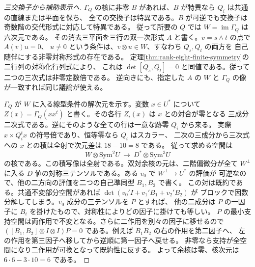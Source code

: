 \begin{proof}[三交換子から補助表示へ]
$\Gamma_Q$ の核に非零 $B$ があれば、$B$ が特異なら $Q_i$ は共通の直線または平面を保ち、
全ての交換子は特異である。$B$ が可逆でも交換子は奇数階の交代形式に対応して特異である。
従って所要の $Q$ では $W=\operatorname{im}\Gamma_Q$ は六次元である。
その消去三平面を三行の双一次形式 $A$ と書く。$v=s\wedge t$ の点で $A(v)u=0$、
$u\ne0$ という条件は、$v\otimes u\in W$、すなわち $Q_s,Q_t$ の両方を
自己随伴にする非零対称形式の存在である。
定理\ref{thm:rank-eight-finite-symmetry}の二行列の対称化行列式により、
これは $\det[Q_s,Q_t]=0$ と同値である。従って二つの三次式は非零定数倍である。
逆向きにも、指定した $A$ の $W$ と $\Gamma_Q$ の像が一致すれば同じ議論が使える。

$\Gamma_Q$ が $W$ に入る線型条件の解次元を示す。変数 $x\in U^*$ について
$Z(x)=\Gamma_Q(xx^t)$ と書く。その各行 $Z_i(x)$ は $x$ との対合が零となる
三成分二次式である。逆にそのような全ての行は一意な跡零 $Q_i$ から来る。
実際 $x\times Q_i^t x$ の符号倍であり、恒等零なら $Q_i$ はスカラー、
二次の三成分から三次式への $x$ との積は全射で次元差は $18-10=8$ である。
従って求める空間は
\[
 W\otimes\mathrm{Sym}^2 U\ \longrightarrow\ D^*\otimes\mathrm{Sym}^3 U
\]
の核である。この積写像は全射である。双対余核の元は、二階偏微分が全て
$W^\perp$ に入る $D$ 値の対称三テンソルである。ある $v_0$ で $W^\perp\to U^*$ の評価が
可逆なので、他の二方向の評価を二つの自己準同型 $B_1,B_2$ で書く。
この対は既約である。共通不変部分空間があれば $\det(v_0'I+v_1'B_1+v_2'B_2)$ が
ブロックで因数分解してしまう。$v_0$ 成分の三テンソルを $P$ とすれば、
他の二成分は $P$ の一因子に $B_i$ を掛けたもので、対称性によりどの因子に掛けても等しい。
$P$ の最小支持空間は両作用で不変となる。さらに二作用を別々の因子に移せるので
$([B_1,B_2]\otimes I\otimes I)P=0$ である。例えば $B_1B_2$ の右の作用を第二因子へ、
左の作用を第三因子へ移してから逆順に第一因子へ戻せる。
非零なら支持が全空間になり二作用が可換となって既約性に反する。
よって余核は零、核次元は $6\cdot6-3\cdot10=6$ である。
\end{proof}

